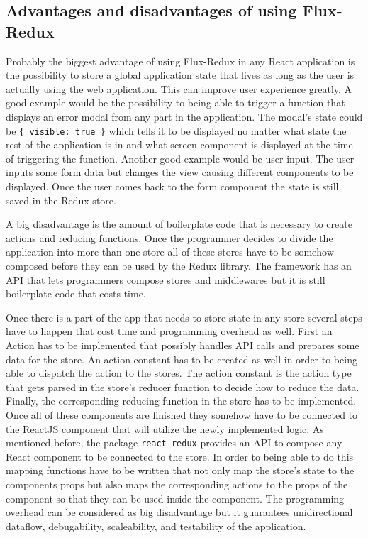 

\subsection{Advantages and disadvantages of using Flux-Redux}

Probably the biggest advantage of using Flux-Redux in any React application is the possibility to store a global application state that lives as long as the user is actually using the web application. This can improve user experience greatly. A good example would be the possibility to being able to trigger a function that displays an error modal from any part in the application. The modal's state could be \texttt{\{ visible: true \}} which tells it to be displayed no matter what state the rest of the application is in and what screen component is displayed at the time of triggering the function. Another good example would be user input. The user inputs some form data but changes the view causing different components to be displayed. Once the user comes back to the form component the state is still saved in the Redux store.

A big disadvantage is the amount of boilerplate code that is necessary to create actions and reducing functions. Once the programmer decides to divide the application into more than one store all of these stores have to be somehow composed before they can be used by the Redux library. The framework has an API that lets programmers compose stores and middlewares but it is still boilerplate code that costs time.

Once there is a part of the app that needs to store state in any store several steps have to happen that cost time and programming overhead as well. First an Action has to be implemented that possibly handles API calls and prepares some data for the store. An action constant has to be created as well in order to being able to dispatch the action to the stores. The action constant is the action type that gets parsed in the store's reducer function to decide how to reduce the data. Finally, the corresponding reducing function in the store has to be implemented. Once all of these components are finished they somehow have to be connected to the ReactJS component that will utilize the newly implemented logic. As mentioned before, the package \texttt{react-redux} provides an API to compose any React component to be connected to the store. In order to being able to do this mapping functions have to be written that not only map the store's state to the components props but also maps the corresponding actions to the props of the component so that they can be used inside the component. The programming overhead can be considered as big disadvantage but it guarantees unidirectional dataflow, debugability, scaleability, and testability of the application.

